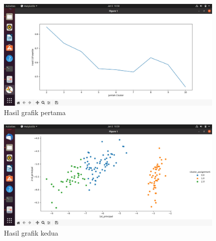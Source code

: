 \begin{enumerate}
\begin{figure} [!ht]
\includegraphics[width=\textwidth] {TugasKelompok/Kelompok3/grafik1}
\caption{Hasil grafik pertama}
\label{gam:hasil tugas kelompok}
\end{figure}

\begin{figure} [!ht]
\includegraphics[width=\textwidth] {TugasKelompok/Kelompok3/grafik2}
\caption{Hasil grafik kedua}
\label{gam:hasil tugas kelompok}
\end{figure}
\end{enumerate}